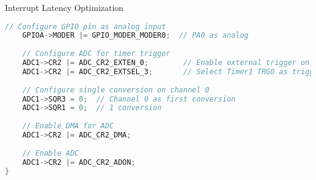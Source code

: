 \begin{example2}{Interrupt Latency Optimization}
\begin{lstlisting}[language=C, style=basesmol]
    // Configure GPIO pin as analog input
    GPIOA->MODER |= GPIO_MODER_MODER0;  // PA0 as analog
    
    // Configure ADC for timer trigger
    ADC1->CR2 |= ADC_CR2_EXTEN_0;        // Enable external trigger on rising edge
    ADC1->CR2 |= ADC_CR2_EXTSEL_3;       // Select Timer1 TRGO as trigger
    
    // Configure single conversion on channel 0
    ADC1->SQR3 = 0;  // Channel 0 as first conversion
    ADC1->SQR1 = 0;  // 1 conversion
    
    // Enable DMA for ADC
    ADC1->CR2 |= ADC_CR2_DMA;
    
    // Enable ADC
    ADC1->CR2 |= ADC_CR2_ADON;
}

\end{lstlisting}
\end{example2}

